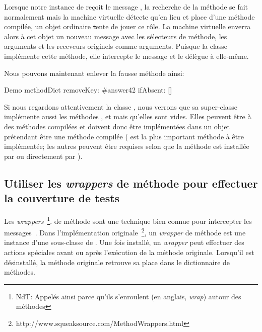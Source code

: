\documentclass[a4paper,10pt,twoside]{book}
\begin{document}
Lorsque notre instance de  reçoit le message , la recherche de la méthode se fait normalement mais la machine virtuelle détecte qu'en lieu et place d'une méthode compilée, un objet ordinaire \st tente de jouer ce rôle.
La machine virtuelle enverra alors à cet objet un nouveau message  avec les sélecteurs de méthode, les arguments et les receveurs originels comme arguments.
Puisque la classe  implémente cette méthode, elle intercepte le message et le délègue à elle-même. 


Nous pouvons maintenant enlever la fausse méthode ainsi:
\begin{code}{}
Demo methodDict removeKey: #answer42 ifAbsent: []
\end{code}

Si nous regardons attentivement la classe , nous verrons que sa super-classe implémente aussi les méthodes ,  et  mais qu'elles sont vides.
Elles peuvent être  %
à des méthodes compilées et doivent donc être implémentées dans un objet prétendant être une méthode compilée ( est la plus important méthode à être implémentée; les autres peuvent être requises selon que la méthode est installée par  ou directement par ).

\subsection{Utiliser les \emph{wrappers} de méthode pour effectuer la couverture de tests}

Les \emph{wrappers}~\footnote{NdT: Appelés ainsi parce qu'ils s'enroulent (en anglais, \emph{wrap}) autour des méthodes}. de méthode sont une technique bien connue pour intercepter les messages~\cite{Bran98a}.
Dans l'implémentation originale~\footnote{http://www.squeaksource.com/MethodWrappers.html}, un \emph{wrapper} de méthode est une instance d'une sous-classe de .
Une fois installé, un \emph{wrapper} peut effectuer des actions spéciales avant ou après l'exécution %
de la méthode originale.
Lorsqu'il est désinstallé, la méthode originale retrouve sa place dans le dictionnaire de méthodes.
\end{document}
